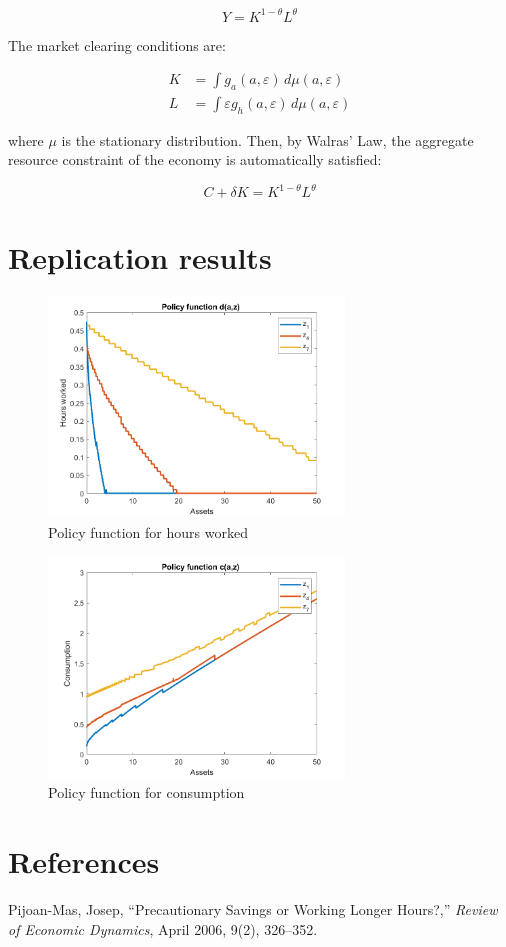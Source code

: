 \documentclass[12pt]{article}
\begin{document}
	\begin{equation*}
		Y = K^{1 - \theta} L^{\theta}
	\end{equation*}
	
	The market clearing conditions are:
	
	\begin{align*}
		K &= \int g_a(a, \varepsilon) \, d\mu(a, \varepsilon) \\
		L &= \int \varepsilon g_h(a, \varepsilon) \, d\mu(a, \varepsilon)
	\end{align*}
	
	where $\mu$ is the stationary distribution. Then, by Walras' Law, the aggregate resource constraint of the economy is automatically satisfied:
	
	\begin{equation*}
		C + \delta K = K^{1 - \theta} L^{\theta}
	\end{equation*}
	

\section*{Replication results}

	

	
	
	\begin{figure}[!htbp]
		\centering
		\includegraphics[width=0.7\textwidth]{pol_hours.png}
		\caption{Policy function for hours worked}
		\label{fig:pol_hours}
	\end{figure}

\begin{figure}[!htbp]
	\centering
	\includegraphics[width=0.7\textwidth]{pol_cons.png}
	\caption{Policy function for consumption}
	\label{fig:pol_hours}
\end{figure}
	
	\section*{References}
	
	Pijoan-Mas, Josep, ``Precautionary Savings or Working Longer Hours?,'' \emph{Review of Economic Dynamics}, April 2006, 9(2), 326--352.
	
\end{document}
